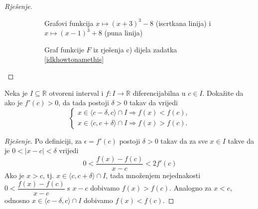 \begin{proof}[Rješenje]
\begin{figure}[ht]
\begin{subfigure}[t]{.5\textwidth}
\caption*{Grafovi funkcija $x\mapsto (x+3)^3-8$ (iscrtkana linija) i $x\mapsto (x-1)^3+8$ (puna linija)}
\end{subfigure}%
\begin{subfigure}[t]{.5\textwidth}
\centering
{}
\caption*{Graf funkcije $F$ iz rješenja c) dijela zadatka \ref{idkhowtonamethis}}
\end{subfigure}
\caption{\label{dergraph}}
\end{figure}
\end{proof}
\newpage
\begin{exercise} 
\label{localder}
Neka je $I\subseteq \mathbb{R}$ otvoreni interval i $f : I \to \mathbb{R}$ diferencijabilna u $c\in I$. Dokažite da ako je $f'(c)>0$, da tada postoji $\delta>0$ takav da vrijedi
$$
\begin{cases}
x\in \langle c-\delta, c\rangle\cap I\Rightarrow f(x)<f(c),\\
x\in \langle c, c+\delta\rangle\cap I\Rightarrow f(x)>f(c).
\end{cases}
$$
\end{exercise}
\begin{proof}[Rješenje]
Po definiciji, za $\epsilon=f'(c)$ postoji $\delta>0$ takav da za sve $x\in I$ takve da je $0<|x-c|<\delta$ vrijedi
$$0<\dfrac{f(x)-f(c)}{x-c}<2f'(c)$$
Ako je $x>c$, tj. $x\in \langle c,c+\delta\rangle\cap I$, tada množenjem nejednakosti $0<\dfrac{f(x)-f(c)}{x-c}$ s $x-c$ dobivamo $f(x)>f(c)$. Analogno za $x<c$, odnosno $x\in \langle c-\delta, c\rangle\cap I$ dobivamo $f(x)<f(c)$.
\end{proof}

